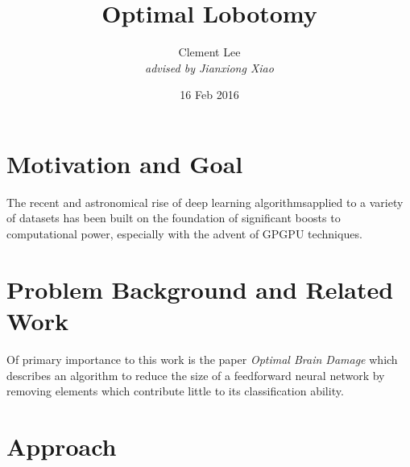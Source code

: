 \documentclass[11pt]{article}
\title{\huge Optimal Lobotomy}
\author{Clement Lee\\\emph{advised by Jianxiong Xiao}}
\date{16 Feb 2016}
\begin{document}
\maketitle

\section{Motivation and Goal}
The recent and astronomical rise of deep learning algorithmsapplied to a variety of datasets has been built on the foundation of significant boosts to computational power, especially with the advent of GPGPU techniques.

\section{Problem Background and Related Work}
Of primary importance to this work is the paper \emph{Optimal Brain Damage} \cite{lecun1989optimal} which describes an algorithm to reduce the size of a feedforward neural network by removing elements which contribute little to its classification ability.


\section{Approach}


\end{document}
